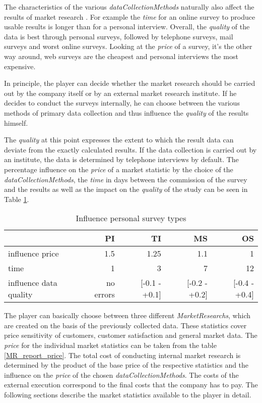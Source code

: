 The characteristics of the various \textit{dataCollectionMethods} naturally also affect the results of market research \cite[Chapter~4.4.2.1]{mooi_getting_2018}. For example the \textit{time} for an online survey to produce usable results is longer than for a personal interview. Overall, the \textit{quality} of the data is best through personal surveys, followed by telephone surveys, mail surveys and worst online surveys. Looking at the \textit{price} of a survey, it's the other way around, web surveys are the cheapest and personal interviews the most expensive. 

In principle, the player can decide whether the market research should be carried out by the company itself or by an external market research institute. If he decides to conduct the surveys internally, he can choose between the various methods of primary data collection and thus influence the \textit{quality} of the results himself. 

The \textit{quality} at this point expresses the extent to which the result data can deviate from the exactly calculated results. If the data collection is carried out by an institute, the data is determined by telephone interviews by default. The percentage influence on the \textit{price} of a market statistic by the choice of the \textit{dataCollectionMethods}, the \textit{time} in days between the commission of the survey and the results as well as the impact on the \textit{quality} of the study can be seen in Table \ref{MR_survey_types_influence}. 

\begin{table}[ht]
\centering
\begin{tabular}{|l|r|r|r|r|}
\hline
& \textbf{PI}      & \textbf{TI}        & \textbf{MS}       & \textbf{OS}  \\ \hline
influence price         & 1.5     & 1.25      & 1.1      & 1   \\
time                    & 1       & 3         & 7        & 12  \\
influence data quality  & no errors & [-0.1 - +0.1] & [-0.2 - +0.2] & [-0.4 - +0.4] \\
\hline
\end{tabular}
\caption{Influence personal survey types}
\label{MR_survey_types_influence}
\end{table}

The player can basically choose between three different \textit{MarketResearchs}, which are created on the basis of the previously collected data. These statistics cover price sensitivity of customers, customer satisfaction and general market data. 
The \textit{price} for the individual market statistics can be taken from the table \ref{MR_report_price}. The total cost of conducting internal market research is determined by the product of the base price of the respective statistics and the influence on the \textit{price} of the chosen \textit{dataCollectionMethods}. The costs of the external execution correspond to the final costs that the company has to pay. 
The following sections describe the market statistics available to the player in detail. \\

